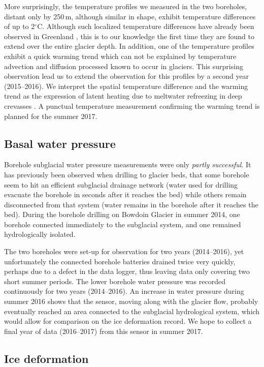 \documentclass{article}
\newcommand{\unit}[1]{\ensuremath{\mathrm{#1}}}
\newcommand{\degree}[0]{\ensuremath{^{\circ}}}
\newcommand{\degC}[0]{\unit{{\degree}C}}
\begin{document}
More surprisingly, the temperature profiles we measured in the two boreholes,
distant only by 250\,m, although similar in shape, exhibit temperature
differences of up to 2\degC. Although such localized temperature differences
have already been observed in Greenland \citep{Luthi.etal.2015}, this is to our
knowledge the first time they are found to extend over the entire glacier
depth. In addition, one of the temperature profiles exhibit a quick warming
trend which can not be explained by temperature advection and diffusion
processed known to occur in glaciers. This surprising observation lead us to
extend the observation for this profiles by a second year (2015--2016). We
interpret the spatial temperature difference and the warming trend as the
expression of latent heating due to meltwater refreezing in deep crevasses
\citep{Seguinot.etal.Inprep}. A punctual temperature measurement confirming
the warming trend is planned for the summer 2017.


\subsection{Basal water pressure}

Borehole subglacial water pressure measurements were only \emph{partly
successful}. It has previously been observed when drilling to glacier beds,
that some borehole seem to hit an efficient subglacial drainage network (water
used for drilling evacuate the borehole in seconds after it reaches the bed)
while others remain disconnected from that system (water remains in the
borehole after it reaches the bed). During the borehole drilling on Bowdoin
Glacier in summer 2014, one borehole connected immediately to the subglacial
system, and one remained hydrologically isolated.

The two boreholes were set-up for observation for two years (2014--2016), yet
unfortunately the connected borehole batteries drained twice very quickly,
perhaps due to a defect in the data logger, thus leaving data only covering two
short summer periods. The lower borehole water pressure was recorded
continuously for two years (2014--2016). An increase in water pressure during
summer 2016 shows that the sensor, moving along with the glacier flow, probably
eventually reached an area connected to the subglacial hydrological system,
which would allow for comparison on the ice deformation record. We hope to
collect a final year of data (2016--2017) from this sensor in summer 2017.


\subsection{Ice deformation}
\end{document}
